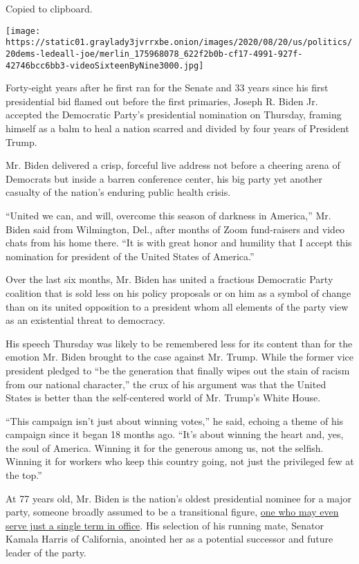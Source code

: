 Copied to clipboard.

\texttt{[image: https://static01.graylady3jvrrxbe.onion/images/2020/08/20/us/politics/20dems-ledeall-joe/merlin\_175968078\_622f2b0b-cf17-4991-927f-42746bcc6bb3-videoSixteenByNine3000.jpg]}

Forty-eight years after he first ran for the Senate and 33 years since
his first presidential bid flamed out before the first primaries, Joseph
R. Biden Jr. accepted the Democratic Party's presidential nomination on
Thursday, framing himself as a balm to heal a nation scarred and divided
by four years of President Trump.

Mr. Biden delivered a crisp, forceful live address not before a cheering
arena of Democrats but inside a barren conference center, his big party
yet another casualty of the nation's enduring public health crisis.

``United we can, and will, overcome this season of darkness in
America,'' Mr. Biden said from Wilmington, Del., after months of Zoom
fund-raisers and video chats from his home there. ``It is with great
honor and humility that I accept this nomination for president of the
United States of America.''

Over the last six months, Mr. Biden has united a fractious Democratic
Party coalition that is sold less on his policy proposals or on him as a
symbol of change than on its united opposition to a president whom all
elements of the party view as an existential threat to democracy.

His speech Thursday was likely to be remembered less for its content
than for the emotion Mr. Biden brought to the case against Mr. Trump.
While the former vice president pledged to ``be the generation that
finally wipes out the stain of racism from our national character,'' the
crux of his argument was that the United States is better than the
self-centered world of Mr. Trump's White House.

``This campaign isn't just about winning votes,'' he said, echoing a
theme of his campaign since it began 18 months ago. ``It's about winning
the heart and, yes, the soul of America. Winning it for the generous
among us, not the selfish. Winning it for workers who keep this country
going, not just the privileged few at the top.''

At 77 years old, Mr. Biden is the nation's oldest presidential nominee
for a major party, someone broadly assumed to be a transitional figure,
\href{https://www.nytimes3xbfgragh.onion/2020/05/03/us/politics/joe-biden-vice-president-pick.html}{one
who may even serve just a single term in office}. His selection of his
running mate, Senator Kamala Harris of California, anointed her as a
potential successor and future leader of the party.


